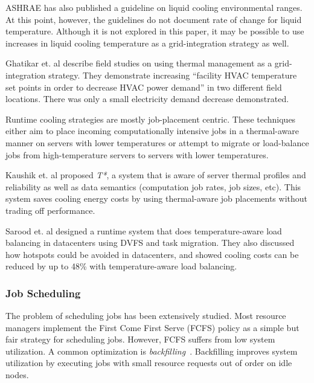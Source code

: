 ASHRAE has also published a guideline on liquid cooling environmental ranges. At this point, however, the guidelines do not document rate of
change for liquid temperature. Although it is not explored in this paper, it
may be possible to use increases in liquid cooling temperature as a
grid-integration strategy as well. 

Ghatikar et. al \cite{Ghatikar2012a} describe field studies on using thermal
management as a grid-integration strategy. They demonstrate increasing ``facility HVAC temperature set points in order to decrease HVAC power
demand” in two different field locations. There was only a small
electricity demand decrease demonstrated.

Runtime cooling strategies are mostly job-placement centric. These techniques
either aim to place incoming computationally intensive jobs in a thermal-aware
manner on servers with lower temperatures or attempt to migrate or load-balance
jobs from high-temperature servers to servers with lower temperatures.

Kaushik et. al \cite{kaushik_t*:_2012} proposed \emph{T*}, a system that is
aware of server thermal profiles and reliability as well as data semantics
(computation job rates, job sizes, etc). This system saves cooling energy costs
by using thermal-aware job placements without trading off performance.

Sarood et. al \cite{SaroodSC11} designed a runtime system that does
temperature-aware load balancing in datacenters using DVFS and task migration.
They also discussed how hotspots could be avoided in datacenters, and showed
cooling costs can be reduced by up to 48\% with temperature-aware load
balancing.

\subsubsection{Job Scheduling}
The problem of scheduling jobs has been extensively studied. Most resource
managers implement the First Come First Serve (FCFS) policy as a simple but fair
strategy for scheduling jobs. However, FCFS suffers from low system utilization.
A common optimization is \emph{backfilling}~\cite{lifka_anl/ibm_1995,mualem_utilization_2001,feitelson_parallel_2004}.
Backfilling improves system utilization by executing jobs with small resource
requests out of order on idle nodes.

